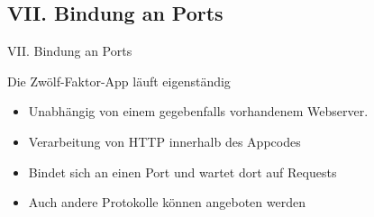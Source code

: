 \documentclass{beamer}
\begin{document}
			\subsection{VII. Bindung an Ports}
				\begin{frame}{VII. Bindung an Ports}
					\begin{block}{Die Zwölf-Faktor-App läuft eigenständig}
						\begin{itemize}
							\item Unabhängig von einem gegebenfalls vorhandenem Webserver.
							\item Verarbeitung von HTTP innerhalb des Appcodes
							\item Bindet sich an einen Port und wartet dort auf Requests
							\item Auch andere Protokolle können angeboten werden
						\end{itemize}
					\end{block}
				\end{frame}
\end{document}
